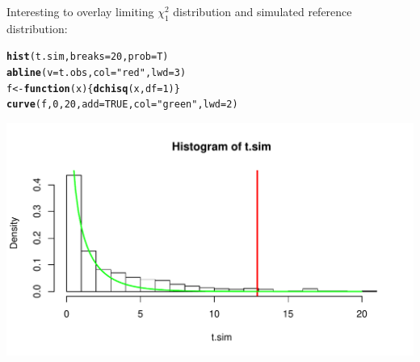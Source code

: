 \documentclass[compress]{beamer}\usepackage[]{graphicx}\usepackage[]{color}
\makeatletter
\def\maxwidth{ %
  \ifdim\Gin@nat@width>\linewidth
    \linewidth
  \else
    \Gin@nat@width
  \fi
}
\newcommand{\hlnum}[1]{\textcolor[rgb]{0.686,0.059,0.569}{#1}}%
\newcommand{\hlstr}[1]{\textcolor[rgb]{0.192,0.494,0.8}{#1}}%
\newcommand{\hlstd}[1]{\textcolor[rgb]{0.345,0.345,0.345}{#1}}%
\newcommand{\hlkwa}[1]{\textcolor[rgb]{0.161,0.373,0.58}{\textbf{#1}}}%
\newcommand{\hlkwb}[1]{\textcolor[rgb]{0.69,0.353,0.396}{#1}}%
\newcommand{\hlkwc}[1]{\textcolor[rgb]{0.333,0.667,0.333}{#1}}%
\newcommand{\hlkwd}[1]{\textcolor[rgb]{0.737,0.353,0.396}{\textbf{#1}}}%
\newenvironment{kframe}{%
 \def\at@end@of@kframe{}%
 \ifinner\ifhmode%
  \def\at@end@of@kframe{\end{minipage}}%
  \begin{minipage}{\columnwidth}%
 \fi\fi%
 \def\FrameCommand##1{\hskip\@totalleftmargin \hskip-\fboxsep
 \colorbox{shadecolor}{##1}\hskip-\fboxsep
     \hskip-\linewidth \hskip-\@totalleftmargin \hskip\columnwidth}%
 \MakeFramed {\advance\hsize-\width
   \@totalleftmargin\z@ \linewidth\hsize
   \@setminipage}}%
 {\par\unskip\endMakeFramed%
 \at@end@of@kframe}
\newenvironment{knitrout}{}{} %
\newenvironment{sframe}
{\begin{frame} [containsverbatim] }
  {\end{frame}}
\makeatother
\begin{document}
\begin{sframe}

  Interesting to overlay limiting $\chi^2_1$
  distribution and simulated reference distribution:
  
\begin{knitrout}\scriptsize
{}\color{fgcolor}\begin{kframe}
\begin{alltt}
\hlkwd{hist}\hlstd{(t.sim,} \hlkwc{breaks}\hlstd{=}\hlnum{20}\hlstd{,} \hlkwc{prob}\hlstd{=T)}
\hlkwd{abline}\hlstd{(}\hlkwc{v}\hlstd{=t.obs,} \hlkwc{col}\hlstd{=}\hlstr{"red"}\hlstd{,} \hlkwc{lwd}\hlstd{=}\hlnum{3}\hlstd{)}
\hlstd{f} \hlkwb{<-} \hlkwa{function}\hlstd{(}\hlkwc{x}\hlstd{)\{}\hlkwd{dchisq}\hlstd{(x,} \hlkwc{df}\hlstd{=}\hlnum{1}\hlstd{)\}}
\hlkwd{curve}\hlstd{(f,} \hlnum{0}\hlstd{,} \hlnum{20}\hlstd{,} \hlkwc{add}\hlstd{=}\hlnum{TRUE}\hlstd{,} \hlkwc{col}\hlstd{=}\hlstr{"green"}\hlstd{,} \hlkwc{lwd}\hlstd{=}\hlnum{2}\hlstd{)}
\end{alltt}
\end{kframe}
\includegraphics[width=\maxwidth]{fig/tartu-unnamed-chunk-21-1} 

\end{knitrout}
  
\end{sframe}
\end{document}
